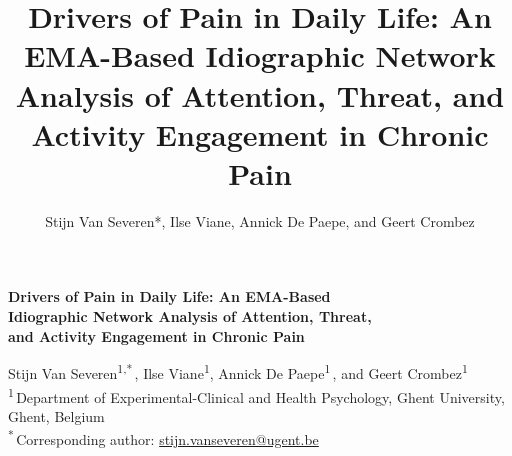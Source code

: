 \documentclass[11pt,a4paper]{article}
\title{Drivers of Pain in Daily Life: An EMA-Based Idiographic Network Analysis of Attention, Threat, and Activity Engagement in Chronic Pain}
\author{Stijn Van Severen*, Ilse Viane, Annick De Paepe, and Geert Crombez}
\date{}
\begin{document}
\begin{titlepage}
\thispagestyle{fancy}
\vspace*{\fill}
\begin{center}
{\fontsize{18.2}{22.8}\selectfont\textbf{Drivers of Pain in Daily Life: An EMA-Based\\
Idiographic Network Analysis of Attention, Threat,\\
and Activity Engagement in Chronic Pain}\par}
\vspace{1.2em}
\normalsize
Stijn Van Severen\textsuperscript{1,*}\,,
Ilse Viane\textsuperscript{1},
Annick De Paepe\textsuperscript{1}\,, and
Geert Crombez\textsuperscript{1}\,\\[0.6em]
\footnotesize
\textsuperscript{1}\,Department of Experimental-Clinical and Health Psychology,
Ghent University, Ghent, Belgium\\
\textsuperscript{*}\,Corresponding author: \href{mailto:stijn.vanseveren@ugent.be}{stijn.vanseveren@ugent.be}
\end{center}
\vspace{0.8em}


\end{titlepage}
\end{document}
